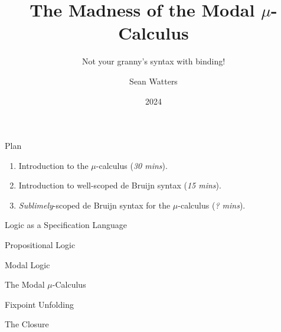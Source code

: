 \documentclass[aspectratio=43]{beamer}
\title[$\mu$-Calculus 101]{The Madness of the Modal $\mu$-Calculus}
\subtitle{Not your granny's syntax with binding!}
\author[S. Watters]{Sean Watters}
\institute{University of Strathclyde}
\date{2024}
\begin{document}
\begin{frame}
  \titlepage{}
\end{frame}

\begin{frame}{Plan}
\begin{enumerate}
\item Introduction to the $\mu$-calculus (\emph{30 mins}).
\item Introduction to well-scoped de Bruijn syntax (\emph{15 mins}).
\item \emph{Sublimely}-scoped de Bruijn syntax for the $\mu$-calculus (\emph{? mins}).
\end{enumerate}
\end{frame}

\begin{frame}{Logic as a Specification Language}
\end{frame}

\begin{frame}{Propositional Logic}
\end{frame}

\begin{frame}{Modal Logic}
\end{frame}

\begin{frame}{The Modal $\mu$-Calculus}
\end{frame}

\begin{frame}{Fixpoint Unfolding}
\end{frame}

\begin{frame}{The Closure}
\end{frame}
\end{document}
